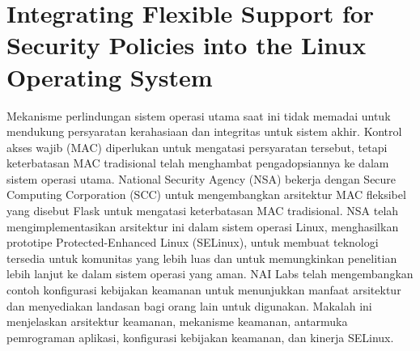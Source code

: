 \documentclass{article}
\begin{document}
\section{Integrating Flexible Support for Security Policies into the Linux Operating System}
Mekanisme perlindungan sistem operasi utama saat ini tidak memadai untuk mendukung persyaratan kerahasiaan dan integritas untuk sistem akhir. Kontrol akses wajib (MAC) diperlukan untuk mengatasi persyaratan tersebut, tetapi keterbatasan MAC tradisional telah menghambat pengadopsiannya ke dalam sistem operasi utama. National Security Agency (NSA) bekerja dengan Secure Computing Corporation (SCC) untuk mengembangkan arsitektur MAC fleksibel yang disebut Flask untuk mengatasi keterbatasan MAC tradisional. NSA telah mengimplementasikan arsitektur ini dalam sistem operasi Linux, menghasilkan prototipe Protected-Enhanced Linux (SELinux), untuk membuat teknologi tersedia untuk komunitas yang lebih luas dan untuk memungkinkan penelitian lebih lanjut ke dalam sistem operasi yang aman. NAI Labs telah mengembangkan contoh konfigurasi kebijakan keamanan untuk menunjukkan manfaat arsitektur dan menyediakan landasan bagi orang lain untuk digunakan. Makalah ini menjelaskan arsitektur keamanan, mekanisme keamanan, antarmuka pemrograman aplikasi, konfigurasi kebijakan keamanan, dan kinerja SELinux.
\end{document}
